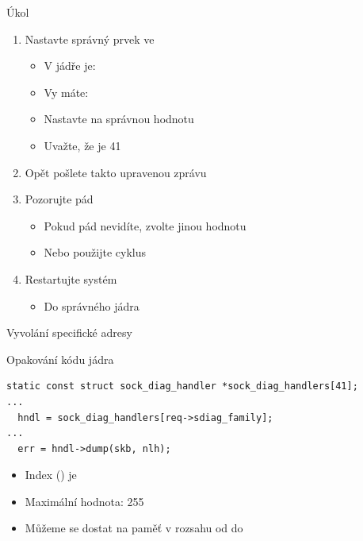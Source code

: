\begin{frame}{Úkol}

  \begin{enumerate}
    \item Nastavte správný prvek ve 
    \begin{itemize}
      \item V jádře je: 
      \item Vy máte: 
      \item Nastavte na správnou hodnotu
      \item Uvažte, že  je 41
    \end{itemize}

    \item Opět pošlete takto upravenou zprávu
    \item Pozorujte pád
    \begin{itemize}
      \item Pokud pád nevidíte, zvolte jinou hodnotu
      \item Nebo použijte cyklus
    \end{itemize}

    \item Restartujte systém
    \begin{itemize}
      \item Do správného jádra
    \end{itemize}
  \end{enumerate}

\end{frame}

\begin{frame}[fragile]{Vyvolání specifické adresy}

  \begin{block}{Opakování kódu jádra}
  \begin{lstlisting}
static const struct sock_diag_handler *sock_diag_handlers[41];
...
  hndl = sock_diag_handlers[req->sdiag_family];
...
  err = hndl->dump(skb, nlh);
\end{lstlisting}
  \end{block}

  \medskip

  \begin{itemize}
    \item Index () je 
    \item Maximální hodnota: 255

    \pause

    \item Můžeme se dostat na paměť v rozsahu od  do
  \end{itemize}

\end{frame}

